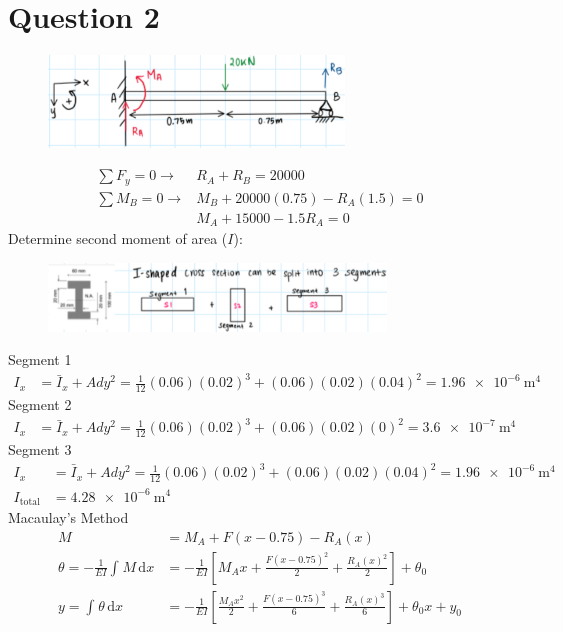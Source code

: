 \documentclass[11pt]{article}
\numberwithin{equation}{section}
\begin{document}
\section{Question 2}
\begin{figure}[H]
  \centering
  \includegraphics[width = 0.7\textwidth]{./img/Q1Sketch.png}
\end{figure}
\begin{align}
  \sum F_y = 0 \rightarrow &R_A + R_B = 20000 \label{Q1Eq1}\\
  \sum M_B = 0 \rightarrow &M_B + 20000(0.75) - R_A(1.5) = 0\\
  & M_A + 15000 - 1.5 R_A = 0 \label{Q1Eq2}
\end{align}
Determine second moment of area ($I$):
\begin{figure}[H]
  \centering
  \includegraphics[width = 0.8\textwidth]{./img/SecondMomentOfInertiaQ2.png}
\end{figure}
Segment 1
\begin{align}
  I_x &= \bar{I}_x + Ady^2 = \frac{1}{12}(0.06)(0.02)^3 + (0.06)(0.02)(0.04)^2 = \SI{1.96e-6}{\meter\tothe{4}}
\end{align}
Segment 2
\begin{align}
  I_x &= \bar{I}_x + Ady^2 = \frac{1}{12}(0.06)(0.02)^3 + (0.06)(0.02)(0)^2 = \SI{3.6e-7}{\meter\tothe{4}}
\end{align}
Segment 3
\begin{align}
  I_x &= \bar{I}_x + Ady^2 = \frac{1}{12} (0.06)(0.02)^3 + (0.06)(0.02)(0.04)^2 = \SI{1.96e-6}{\meter\tothe{4}}\\
  I_{\textrm{total}} &= \SI{4.28e-6}{\meter\tothe{4}}
\end{align}
Macaulay's Method
\begin{align}
  M &= M_A + F(x-0.75) - R_A(x)\\
  \theta = -\frac{1}{EI} \int_{}^{} M \,\mathrm{d}x &= -\frac{1}{EI} \left[ M_A x + \frac{F(x-0.75)^2}{2} + \frac{R_A(x)^2}{2} \right] + \theta_0\\
  y = \int_{}^{} \theta \,\mathrm{d}x &= -\frac{1}{EI} \left[ \frac{M_Ax^2}{2} + \frac{F(x-0.75)^3}{6} + \frac{R_A (x)^3}{6} \right] + \theta_0 x + y_0
\end{align}
\end{document}
